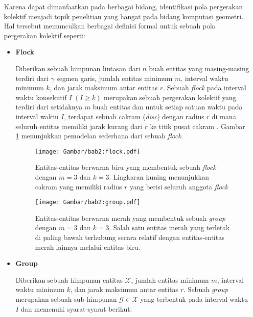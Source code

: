 Karena dapat dimanfaatkan pada berbagai bidang, identifikasi pola pergerakan kolektif menjadi topik penelitian yang hangat pada bidang komputasi geometri. Hal tersebut memunculkan berbagai definisi formal untuk sebuah pola pergerakan kolektif seperti:

\begin{itemize}
    \item \textbf{Flock}
    
    Diberikan sebuah himpunan lintasan dari $n$ buah entitas yang masing-masing terdiri dari $\gamma$ segmen garis, jumlah entitas minimum $m$, interval waktu minimum $k$, dan jarak maksimum antar entitas $r$. Sebuah \textit{flock} pada interval waktu konsekutif $I\;(I \geq k)$ merupakan sebuah pergerakan kolektif yang terdiri dari setidaknya $m$ buah entitas dan untuk setiap satuan waktu pada interval waktu $I$, terdapat sebuah cakram (\textit{disc}) dengan radius $r$ di mana seluruh entitas memiliki jarak kurang dari $r$ ke titik pusat cakram \cite{gudmundsson:flock}. Gambar \ref{bab2:flock} menunjukkan pemodelan sederhana dari sebuah \textit{flock}.
    
    \begin{figure}[h]
        \centering
        \texttt{[image: Gambar/bab2:flock.pdf]}
        \caption[Sebuah \textit{flock}]{Entitas-entitas berwarna biru yang membentuk sebuah \textit{flock} dengan $m = 3$ dan $k = 3$. Lingkaran kuning menunjukkan cakram yang memiliki radius $r$ yang berisi seluruh anggota \textit{flock}}
        \label{bab2:flock}
    \end{figure}
    
    \begin{figure}[t]
        \centering
        \texttt{[image: Gambar/bab2:group.pdf]}
        \caption[Sebuah \textit{group}]{Entitas-entitas berwarna merah yang membentuk sebuah \textit{group} dengan $m = 3$ dan $k = 3$. Salah satu entitas merah yang terletak di paling bawah terhubung secara relatif dengan entitas-entitas merah lainnya melalui entitas biru.}
        \label{bab2:group}
    \end{figure}
    
    \item \textbf{Group}
    
    Diberikan sebuah himpunan entitas $\mathcal{X}$, jumlah entitas minimum $m$, interval waktu minimum $k$, dan jarak maksimum antar entitas $r$. Sebuah \textit{group} merupakan sebuah sub-himpunan $\mathcal{G} \in \mathcal{X}$ yang terbentuk pada interval waktu $I$ dan memenuhi syarat-syarat berikut:
    

\end{itemize}
